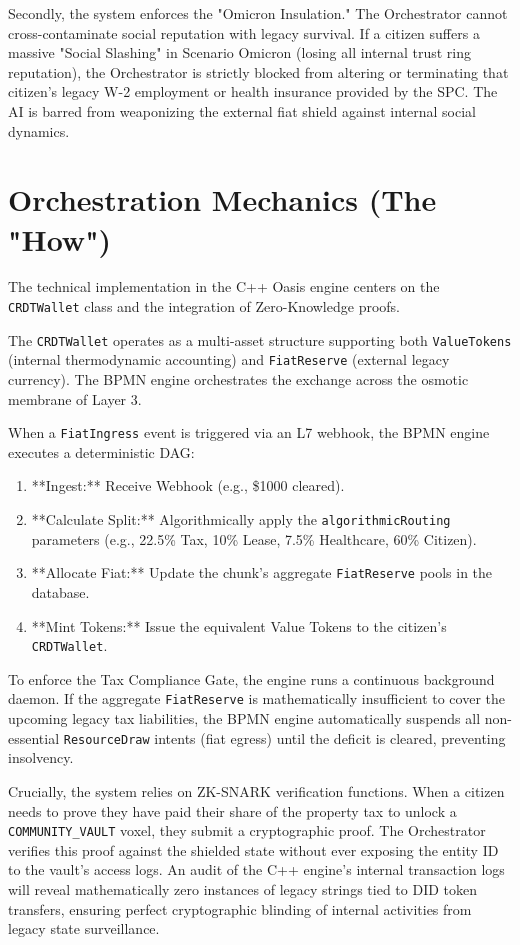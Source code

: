Secondly, the system enforces the "Omicron Insulation." The Orchestrator cannot cross-contaminate social reputation with legacy survival. If a citizen suffers a massive "Social Slashing" in Scenario Omicron (losing all internal trust ring reputation), the Orchestrator is strictly blocked from altering or terminating that citizen's legacy W-2 employment or health insurance provided by the SPC. The AI is barred from weaponizing the external fiat shield against internal social dynamics.

\section{Orchestration Mechanics (The "How")}
The technical implementation in the C++ Oasis engine centers on the \texttt{CRDTWallet} class and the integration of Zero-Knowledge proofs.

The \texttt{CRDTWallet} operates as a multi-asset structure supporting both \texttt{ValueTokens} (internal thermodynamic accounting) and \texttt{FiatReserve} (external legacy currency). The BPMN engine orchestrates the exchange across the osmotic membrane of Layer 3.

When a \texttt{FiatIngress} event is triggered via an L7 webhook, the BPMN engine executes a deterministic DAG:
\begin{enumerate}
    \item **Ingest:** Receive Webhook (e.g., \$1000 cleared).
    \item **Calculate Split:** Algorithmically apply the \texttt{algorithmicRouting} parameters (e.g., 22.5\% Tax, 10\% Lease, 7.5\% Healthcare, 60\% Citizen).
    \item **Allocate Fiat:** Update the chunk's aggregate \texttt{FiatReserve} pools in the database.
    \item **Mint Tokens:** Issue the equivalent Value Tokens to the citizen's \texttt{CRDTWallet}.
\end{enumerate}

To enforce the Tax Compliance Gate, the engine runs a continuous background daemon. If the aggregate \texttt{FiatReserve} is mathematically insufficient to cover the upcoming legacy tax liabilities, the BPMN engine automatically suspends all non-essential \texttt{ResourceDraw} intents (fiat egress) until the deficit is cleared, preventing insolvency.

Crucially, the system relies on ZK-SNARK verification functions. When a citizen needs to prove they have paid their share of the property tax to unlock a \texttt{COMMUNITY\_VAULT} voxel, they submit a cryptographic proof. The Orchestrator verifies this proof against the shielded state without ever exposing the entity ID to the vault's access logs. An audit of the C++ engine's internal transaction logs will reveal mathematically zero instances of legacy strings tied to DID token transfers, ensuring perfect cryptographic blinding of internal activities from legacy state surveillance.
